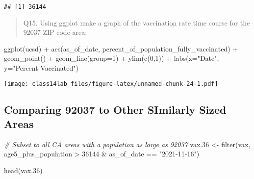 \documentclass[
]{article}
\newenvironment{Shaded}{\begin{snugshade}}{\end{snugshade}}
\newcommand{\AttributeTok}[1]{\textcolor[rgb]{0.77,0.63,0.00}{#1}}
\newcommand{\CommentTok}[1]{\textcolor[rgb]{0.56,0.35,0.01}{\textit{#1}}}
\newcommand{\DecValTok}[1]{\textcolor[rgb]{0.00,0.00,0.81}{#1}}
\newcommand{\FloatTok}[1]{\textcolor[rgb]{0.00,0.00,0.81}{#1}}
\newcommand{\FunctionTok}[1]{\textcolor[rgb]{0.00,0.00,0.00}{#1}}
\newcommand{\NormalTok}[1]{#1}
\newcommand{\OtherTok}[1]{\textcolor[rgb]{0.56,0.35,0.01}{#1}}
\newcommand{\SpecialCharTok}[1]{\textcolor[rgb]{0.00,0.00,0.00}{#1}}
\newcommand{\StringTok}[1]{\textcolor[rgb]{0.31,0.60,0.02}{#1}}
\begin{document}
\begin{Shaded}
\end{Shaded}

\begin{verbatim}
## [1] 36144
\end{verbatim}

\begin{quote}
Q15. Using ggplot make a graph of the vaccination rate time course for
the 92037 ZIP code area:
\end{quote}

\begin{Shaded}
\begin{Highlighting}[]
\FunctionTok{ggplot}\NormalTok{(ucsd) }\SpecialCharTok{+}
  \FunctionTok{aes}\NormalTok{(as\_of\_date, percent\_of\_population\_fully\_vaccinated) }\SpecialCharTok{+}
  \FunctionTok{geom\_point}\NormalTok{() }\SpecialCharTok{+}
  \FunctionTok{geom\_line}\NormalTok{(}\AttributeTok{group=}\DecValTok{1}\NormalTok{) }\SpecialCharTok{+}
  \FunctionTok{ylim}\NormalTok{(}\FunctionTok{c}\NormalTok{(}\DecValTok{0}\NormalTok{,}\DecValTok{1}\NormalTok{)) }\SpecialCharTok{+}
  \FunctionTok{labs}\NormalTok{(}\AttributeTok{x=}\StringTok{"Date"}\NormalTok{, }\AttributeTok{y=}\StringTok{"Percent Vaccinated"}\NormalTok{)}
\end{Highlighting}
\end{Shaded}

\texttt{[image: class14lab\_files/figure-latex/unnamed-chunk-24-1.pdf]}

\hypertarget{comparing-92037-to-other-similarly-sized-areas}{%
\subsection{Comparing 92037 to Other SImilarly Sized
Areas}\label{comparing-92037-to-other-similarly-sized-areas}}

\begin{Shaded}
\begin{Highlighting}[]
\CommentTok{\# Subset to all CA areas with a population as large as 92037}
\NormalTok{vax}\FloatTok{.36} \OtherTok{\textless{}{-}} \FunctionTok{filter}\NormalTok{(vax, age5\_plus\_population }\SpecialCharTok{\textgreater{}} \DecValTok{36144} \SpecialCharTok{\&}
\NormalTok{                as\_of\_date }\SpecialCharTok{==} \StringTok{"2021{-}11{-}16"}\NormalTok{)}

\FunctionTok{head}\NormalTok{(vax}\FloatTok{.36}\NormalTok{)}
\end{Highlighting}
\end{Shaded}
\end{document}
